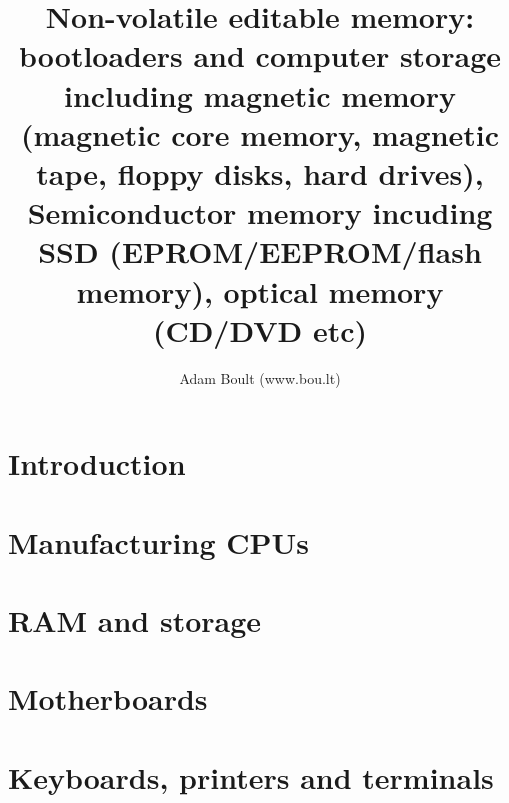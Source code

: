\documentclass[oneside]{book}
\begin{document}
\author{Adam Boult (www.bou.lt)}
\title{Non-volatile editable memory: bootloaders and computer storage including magnetic memory (magnetic core memory, magnetic tape, floppy disks, hard drives), Semiconductor memory incuding SSD (EPROM/EEPROM/flash memory), optical memory (CD/DVD etc)}
\maketitle

\setcounter{tocdepth}{0}
\tableofcontents



\part{Introduction}

\part{Manufacturing CPUs}

\part{RAM and storage}

\part{Motherboards}

\part{Keyboards, printers and terminals}
\end{document}
